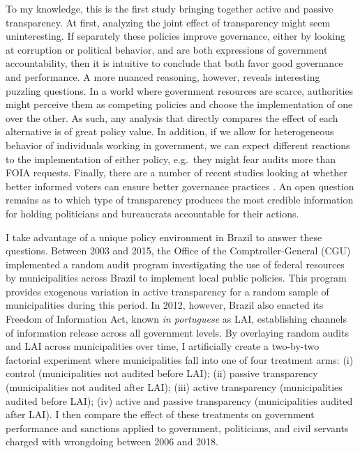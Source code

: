 \documentclass[11pt]{article}
\begin{document}
To my knowledge, this is the first study bringing together active and passive transparency. At first, analyzing the joint effect of transparency might seem uninteresting. If separately these policies improve governance, either by looking at corruption or political behavior, and are both expressions of government accountability, then it is intuitive to conclude that both favor good governance and performance. A more nuanced reasoning, however, reveals interesting puzzling questions. In a world where government resources are scarce, authorities might perceive them as competing policies and choose the implementation of one over the other. As such, any analysis that directly compares the effect of each alternative is of great policy value. In addition, if we allow for heterogeneous behavior of individuals working in government, we can expect different reactions to the implementation of either policy, e.g.~they might fear audits more than FOIA requests. Finally, there are a number of recent studies looking at whether better informed voters can ensure better governance practices \citep{PandeCaninformedvoters2011,WintersLackingInformationCondoning2013,ChongDoesCorruptionInformation2015,Weitz-ShapiroCanCitizensDiscern2017}. An open question remains as to which type of transparency produces the most credible information for holding politicians and bureaucrats accountable for their actions.

I take advantage of a unique policy environment in Brazil to answer these questions. Between 2003 and 2015, the Office of the Comptroller-General (CGU) implemented a random audit program investigating the use of federal resources by municipalities across Brazil to implement local public policies. This program provides exogenous variation in active transparency for a random sample of municipalities during this period. In 2012, however, Brazil also enacted its Freedom of Information Act, known  \emph{in portuguese} as LAI, establishing channels of information release across all government levels. By overlaying random audits and LAI across municipalities over time, I artificially create a two-by-two factorial experiment where municipalities fall into one of four treatment arms: (i) control (municipalities not audited before LAI); (ii) passive transparency (municipalities not audited after LAI); (iii) active transparency (municipalities audited before LAI); (iv) active and passive transparency (municipalities audited after LAI). I then compare the effect of these treatments on government performance and sanctions applied to government, politicians, and civil servants charged with wrongdoing between 2006 and 2018.
\end{document}
